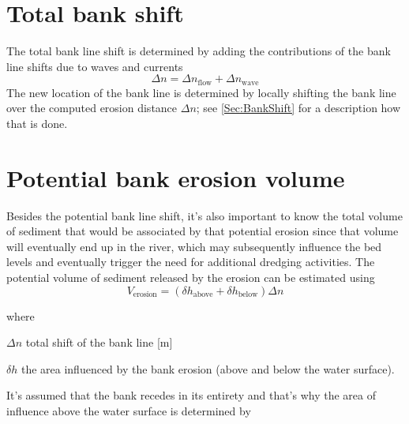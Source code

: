 \section{Total bank shift} \label{Sec4.3}

The total bank line shift is determined by adding the contributions of the bank line shifts due to waves and currents
%
\begin{equation}
\Delta n = \Delta n_\text{flow} + \Delta n_\text{wave}
\end{equation}
%
The new location of the bank line is determined by locally shifting the bank line over the computed erosion distance $\Delta n$; see \autoref{Sec:BankShift} for a description how that is done.

\section{Potential bank erosion volume} \label{Sec4.4}

Besides the potential bank line shift, it's also important to know the total volume of sediment that would be associated by that potential erosion since that volume will eventually end up in the river, which may subsequently influence the bed levels and eventually trigger the need for additional dredging activities.
The potential volume of sediment released by the erosion can be estimated using
%
\begin{equation}
V_\text{erosion} = ( \delta h_\text{above} + \delta h_\text{below} ) \Delta n
\end{equation}

where 
\begin{symbollist}
	\item[$\Delta n$] total shift of the bank line [m]
	\item[$\delta h$] the area influenced by the bank erosion (above and below the water surface).
\end{symbollist}
It's assumed that the bank recedes in its entirety and that's why the area of influence above the water surface is determined by

